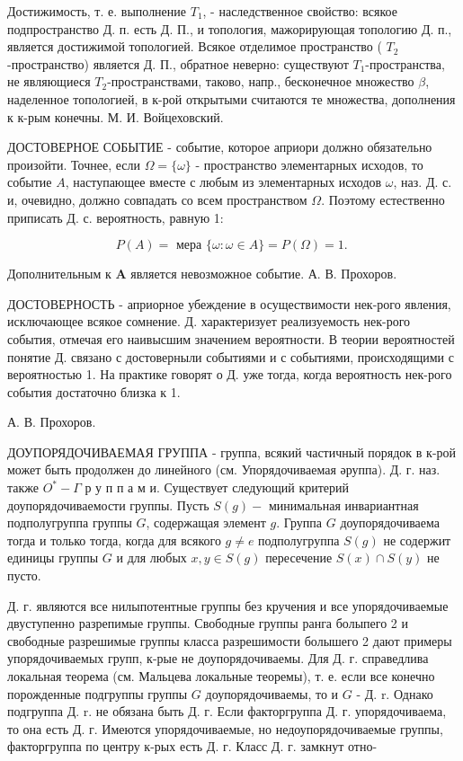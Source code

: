 \documentclass[10pt]{article}
\begin{document}
Достижимость, т. е. выполнение $T_{1}$, - наследственное свойство: всякое подпространство Д. п. есть Д. П., и топология, мажорирующая топологию Д. п., является достижимой топологией. Всякое отделимое пространство ( $T_{2}$-пространство) является Д. П., обратное неверно: существуют $T_{1}$-пространства, не являющиеся $T_{2}$-пространствами, таково, напр., бесконечное множество $\beta$, наделенное топологией, в к-рой открытыми считаются те множества, дополнения к к-рым конечны. М. И. Войцеховский.



ДОСТОВЕРНОЕ СОБЫТИЕ - событие, которое априори должно обязательно произойти. Точнее, если $\Omega=\{\omega\}$ - пространство элементарных исходов, то событие $A$, наступающее вместе с любым из элементарных исходов $\omega$, наз. Д. с. и, очевидно, должно совпадать со всем пространством $\Omega$. Поэтому естественно приписать Д. с. вероятность, равную 1:



\[

P(A)=\text { мера }\{\omega: \omega \in A\}=P(\Omega)=1 \text {. }

\]



Дополнительным к $\boldsymbol{A}$ является невозможное событие. А. В. Прохоров.



ДОСТОВЕРНОСТЬ - априорное убеждение в осуществимости нек-рого явления, исключающее всякое сомнение. Д. характеризует реализуемость нек-рого события, отмечая его наивысшим значением вероятности. В теории вероятностей понятие Д. связано с достоверныли событиями и с событиями, происходящими с вероятностью 1. На практике говорят о Д. уже тогда, когда вероятность нек-рого события достаточно близка к 1.



А. В. Прохоров.



ДОУПОРЯДОЧИВАЕМАЯ ГРУППА - группа, всякий частичный порядок в к-рой может быть продолжен до линейного (см. Упорядочиваемая әруппа). Д. г. наз. также $O^{*}-\Gamma$ р у п п а м и. Существует следующий критерий доупорядочиваемости группы. Пусть $S(g)-$ минимальная инвариантная подполугруппа группы $G$, содержащая элемент $g$. Группа $G$ доупорядочиваема тогда и только тогда, когда для всякого $g \neq e$ подполугруппа $S(g)$ не содержит единицы группы $G$ и для любых $x, y \in S(g)$ пересечение $S(x) \cap S(y)$ не пусто.



Д. г. являются все нилыпотентные группы без кручения и все упорядочиваемые двуступенно разрепимые группы. Свободные группы ранга болыпего 2 и свободные разрешимые группы класса разрешимости болышего 2 дают примеры упорядочиваемых групп, к-рые не доупорядочиваемы. Для Д. г. справедлива локальная теорема (см. Мальцева локальные теоремы), т. е. если все конечно порожденные подгруппы группы $G$ доупорядочиваемы, то и $G$ - Д. r. Однако подгруппа Д. r. не обязана быть Д. г. Если факторгруппа Д. г. упорядочиваема, то она есть Д. г. Имеются упорядочиваемые, но недоупорядочиваемые группы, факторгруппа по центру к-рых есть Д. г. Класс Д. г. замкнут отно-
\end{document}
